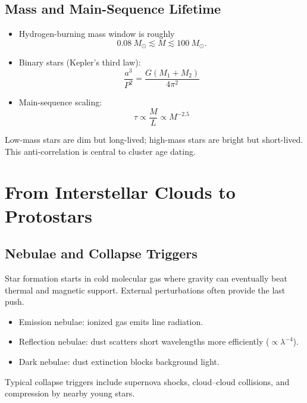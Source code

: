 \subsection{Mass and Main-Sequence Lifetime}
\begin{theory}
\begin{itemize}
    \item Hydrogen-burning mass window is roughly
    \begin{equation}
        \SI{0.08}{}M_\odot \lesssim M \lesssim \SI{100}{}M_\odot.
    \end{equation}
    \item Binary stars (Kepler's third law):
    \begin{equation}
        \frac{a^3}{P^2} = \frac{G(M_1+M_2)}{4\pi^2}
    \end{equation}
    \item Main-sequence scaling:
    \begin{equation}
        \tau \propto \frac{M}{L} \propto M^{-2.5}
    \end{equation}
\end{itemize}
\end{theory}

\begin{remark}
Low-mass stars are dim but long-lived; high-mass stars are bright but short-lived.
This anti-correlation is central to cluster age dating.
\end{remark}

\section{From Interstellar Clouds to Protostars}

\subsection{Nebulae and Collapse Triggers}
\begin{intuition}
Star formation starts in cold molecular gas where gravity can eventually beat thermal and magnetic support.
External perturbations often provide the last push.
\end{intuition}

\begin{theory}
\begin{itemize}
    \item Emission nebulae: ionized gas emits line radiation.
    \item Reflection nebulae: dust scatters short wavelengths more efficiently ($\propto \lambda^{-4}$).
    \item Dark nebulae: dust extinction blocks background light.
\end{itemize}

Typical collapse triggers include supernova shocks, cloud--cloud collisions, and compression by nearby young stars.
\end{theory}

